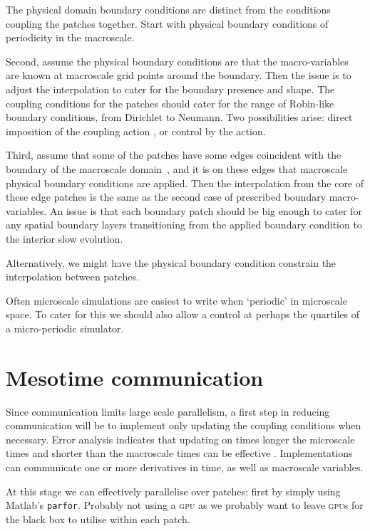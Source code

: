 The physical domain boundary conditions are distinct from the conditions coupling the patches together.
Start with physical boundary conditions of periodicity in the macroscale.

Second, assume the physical boundary conditions are that the macro-variables are known at macroscale grid points around the boundary.  
Then the issue is to adjust the interpolation to cater for the boundary presence and shape.
The coupling conditions for the patches should cater for the range of Robin-like boundary conditions, from Dirichlet to Neumann.
Two possibilities arise: direct imposition of the coupling action \citep{Roberts06d}, or control by the action.

Third, assume that some of the patches have some edges coincident with the boundary of the macroscale domain~\XX, and it is on these edges that macroscale physical boundary conditions are applied.
Then the interpolation from the core of these edge patches is the same as the second case of prescribed boundary macro-variables.
An issue is that each boundary patch should be big enough to cater for any spatial boundary layers transitioning from the applied boundary condition to the interior slow evolution.

Alternatively, we might have the physical boundary condition constrain the interpolation between patches.

Often microscale simulations are easiest to write when `periodic' in microscale space.  
To cater for this we should also allow a control at perhaps the quartiles of a micro-periodic simulator.





\section{Mesotime communication}

Since communication limits large scale parallelism, a first step in reducing communication will be to implement only updating the coupling conditions when necessary.
Error analysis indicates that updating on times longer the microscale times and shorter than the macroscale times can be effective
\citep{Bunder2015a}.
Implementations can communicate one or more derivatives in time, as well as macroscale variables.

At this stage we can effectively parallelise over patches: first by simply using Matlab's \texttt{parfor}.   
Probably not using a \textsc{gpu} as we probably want to leave \textsc{gpu}s for the black box to utilise within each patch.




